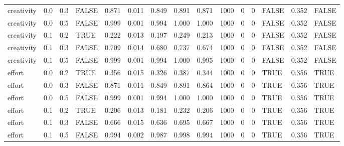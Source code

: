 \begin{table}[!h]
{\begin{tabular}[t]{lrrlrrrrrrrrlrl}
creativity & 0.0 & 0.3 & FALSE & 0.871 & 0.011 & 0.849 & 0.891 & 0.871 & 1000 & 0 & 0 & FALSE & 0.352 & FALSE\\
creativity & 0.0 & 0.5 & FALSE & 0.999 & 0.001 & 0.994 & 1.000 & 1.000 & 1000 & 0 & 0 & FALSE & 0.352 & FALSE\\
creativity & 0.1 & 0.2 & TRUE & 0.222 & 0.013 & 0.197 & 0.249 & 0.213 & 1000 & 0 & 0 & FALSE & 0.352 & FALSE\\
creativity & 0.1 & 0.3 & FALSE & 0.709 & 0.014 & 0.680 & 0.737 & 0.674 & 1000 & 0 & 0 & FALSE & 0.352 & FALSE\\
\addlinespace
creativity & 0.1 & 0.5 & FALSE & 0.999 & 0.001 & 0.994 & 1.000 & 0.995 & 1000 & 0 & 0 & FALSE & 0.352 & FALSE\\
effort & 0.0 & 0.2 & TRUE & 0.356 & 0.015 & 0.326 & 0.387 & 0.344 & 1000 & 0 & 0 & TRUE & 0.356 & TRUE\\
effort & 0.0 & 0.3 & FALSE & 0.871 & 0.011 & 0.849 & 0.891 & 0.864 & 1000 & 0 & 0 & TRUE & 0.356 & TRUE\\
effort & 0.0 & 0.5 & FALSE & 0.999 & 0.001 & 0.994 & 1.000 & 1.000 & 1000 & 0 & 0 & TRUE & 0.356 & TRUE\\
effort & 0.1 & 0.2 & TRUE & 0.206 & 0.013 & 0.181 & 0.232 & 0.206 & 1000 & 0 & 0 & TRUE & 0.356 & TRUE\\
\addlinespace
effort & 0.1 & 0.3 & FALSE & 0.666 & 0.015 & 0.636 & 0.695 & 0.667 & 1000 & 0 & 0 & TRUE & 0.356 & TRUE\\
effort & 0.1 & 0.5 & FALSE & 0.994 & 0.002 & 0.987 & 0.998 & 0.994 & 1000 & 0 & 0 & TRUE & 0.356 & TRUE\\
\bottomrule
\end{tabular}}
\end{table}